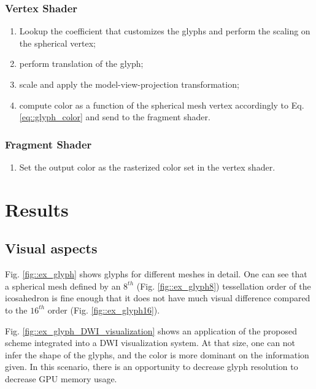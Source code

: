 \documentclass[twoside,twocolumn,10pt]{article}
\begin{document}
\subsubsection{Vertex Shader}
\begin{enumerate}
    \item Lookup the coefficient that customizes the glyphs and perform the scaling on the spherical vertex;
    \item perform translation of the glyph;
    \item scale and apply the model-view-projection transformation;
    \item compute color as a function of the spherical mesh vertex accordingly to Eq. \ref{eq::glyph_color} and send to the fragment shader.
\end{enumerate}
\subsubsection{Fragment Shader}
\begin{enumerate}
    \item Set the output color as the rasterized color set in the vertex shader.
\end{enumerate}





\section{Results}
\label{sec::results}

\subsection{Visual aspects}

Fig. \ref{fig::ex_glyph} shows glyphs for different meshes in detail. One can see that a spherical mesh defined by an $8^{th}$ (Fig. \ref{fig::ex_glyph8}) tessellation order of the icosahedron is fine enough that it does not have much visual difference compared to the $16^{th}$ order (Fig. \ref{fig::ex_glyph16}).

Fig. \ref{fig::ex_glyph_DWI_visualization} shows an application of the proposed scheme integrated into a DWI visualization system. At that size, one can not infer the shape of the glyphs, and the color is more dominant on the information given. In this scenario, there is an opportunity to decrease glyph resolution to decrease GPU memory usage.
\end{document}
